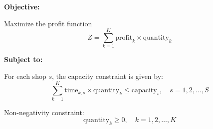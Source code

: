 \documentclass{article}
\begin{document}
\textbf{Objective:}

Maximize the profit function
\[
Z = \sum_{k=1}^{K} \text{profit}_{k} \times \text{quantity}_{k}
\]

\textbf{Subject to:}

For each shop \( s \), the capacity constraint is given by:
\[
\sum_{k=1}^{K} \text{time}_{k,s} \times \text{quantity}_{k} \leq \text{capacity}_{s}, \quad s = 1, 2, \ldots, S
\]

Non-negativity constraint:
\[
\text{quantity}_{k} \geq 0, \quad k = 1, 2, \ldots, K
\]
\end{document}
